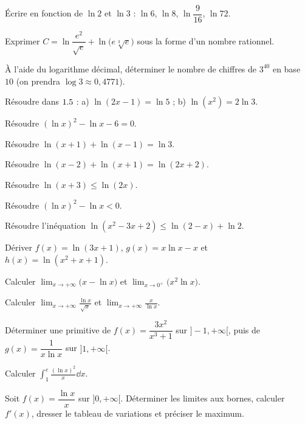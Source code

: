 \exo{} Écrire en fonction de $\ln 2$ et $\ln 3$ : $\ln 6$, $\ln 8$, $\ln\dfrac9{16}$,
$\ln 72$.

\exo{} Exprimer $C=\ln\dfrac{e^{2}}{\sqrt e}+\ln\big(e\sqrt[3]{e}\big)$ sous la forme
d'un nombre rationnel.

\exo{} À l'aide du logarithme décimal, déterminer le nombre de chiffres de $3^{40}$
en base $10$ (on prendra $\log 3\approx0{,}4771$).

\exo{} Résoudre dans $1.5$ : a) $\ln(2x-1)=\ln 5$ ; b) $\ln(x^{2})=2\ln 3$.

\exo{} Résoudre $(\ln x)^{2}-\ln x-6=0$.

\exo{} Résoudre $\ln(x+1)+\ln(x-1)=\ln 3$.

\exo{} Résoudre $\ln(x-2)+\ln(x+1)=\ln(2x+2)$.

\exo{} Résoudre $\ln(x+3)\le\ln(2x)$.

\exo{} Résoudre $(\ln x)^{2}-\ln x<0$.

\exo{} Résoudre l'inéquation $\ln(x^{2}-3x+2)\le\ln(2-x)+\ln 2$.

\exo{} Dériver $f(x)=\ln(3x+1)$, $g(x)=x\ln x-x$ et $h(x)=\ln(x^{2}+x+1)$.

\exo{} Calculer $\displaystyle\lim_{x\to+\infty}\big(x-\ln x\big)$ et
$\displaystyle\lim_{x\to0^{+}}\big(x^{2}\ln x\big)$.

\exo{} Calculer $\displaystyle\lim_{x\to+\infty}\frac{\ln x}{\sqrt x}$ et
$\displaystyle\lim_{x\to+\infty}\frac{x}{\ln x}$.

\exo{} Déterminer une primitive de $f(x)=\dfrac{3x^{2}}{x^{3}+1}$ sur $]-1,+\infty[$,
puis de $g(x)=\dfrac1{x\ln x}$ sur $]1,+\infty[$.

\exo{} Calculer $\displaystyle\int_{1}^{e}\frac{(\ln x)^{2}}{x}\dd x$.

\exo{} Soit $f(x)=\dfrac{\ln x}{x}$ sur $]0,+\infty[$. Déterminer les limites aux
bornes, calculer $f'(x)$, dresser le tableau de variations et préciser le maximum.

